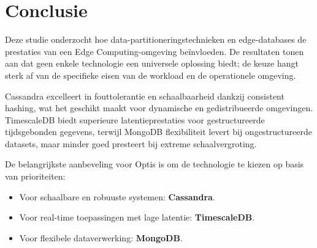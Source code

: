 
\chapter{Conclusie}%
\label{ch:conclusie}

Deze studie onderzocht hoe data-partitioneringstechnieken en edge-databases de prestaties van een Edge Computing-omgeving beïnvloeden. De resultaten tonen aan dat geen enkele technologie een universele oplossing biedt; de keuze hangt sterk af van de specifieke eisen van de workload en de operationele omgeving.

Cassandra excelleert in fouttolerantie en schaalbaarheid dankzij consistent hashing, wat het geschikt maakt voor dynamische en gedistribueerde omgevingen. TimescaleDB biedt superieure latentieprestaties voor gestructureerde tijdsgebonden gegevens, terwijl MongoDB flexibiliteit levert bij ongestructureerde datasets, maar minder goed presteert bij extreme schaalvergroting. 

De belangrijkste aanbeveling voor Optis is om de technologie te kiezen op basis van prioriteiten:
\begin{itemize}
    \item Voor schaalbare en robuuste systemen: \textbf{Cassandra}.
    \item Voor real-time toepassingen met lage latentie: \textbf{TimescaleDB}.
    \item Voor flexibele dataverwerking: \textbf{MongoDB}.
\end{itemize}

